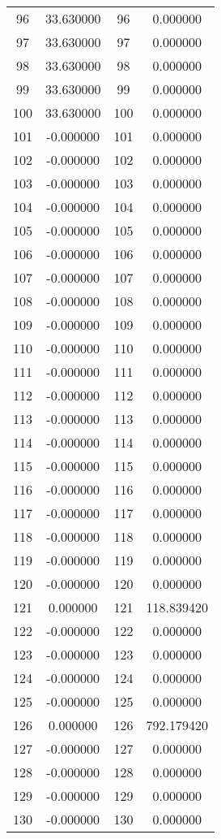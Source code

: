 \documentclass[12pt]{article}
\begin{document}
\begin{longtable}{@{}cccc@{}}
96 & 33.630000 & 96 & 0.000000 \\
97 & 33.630000 & 97 & 0.000000 \\
98 & 33.630000 & 98 & 0.000000 \\
99 & 33.630000 & 99 & 0.000000 \\
100 & 33.630000 & 100 & 0.000000 \\
101 & -0.000000 & 101 & 0.000000 \\
102 & -0.000000 & 102 & 0.000000 \\
103 & -0.000000 & 103 & 0.000000 \\
104 & -0.000000 & 104 & 0.000000 \\
105 & -0.000000 & 105 & 0.000000 \\
106 & -0.000000 & 106 & 0.000000 \\
107 & -0.000000 & 107 & 0.000000 \\
108 & -0.000000 & 108 & 0.000000 \\
109 & -0.000000 & 109 & 0.000000 \\
110 & -0.000000 & 110 & 0.000000 \\
111 & -0.000000 & 111 & 0.000000 \\
112 & -0.000000 & 112 & 0.000000 \\
113 & -0.000000 & 113 & 0.000000 \\
114 & -0.000000 & 114 & 0.000000 \\
115 & -0.000000 & 115 & 0.000000 \\
116 & -0.000000 & 116 & 0.000000 \\
117 & -0.000000 & 117 & 0.000000 \\
118 & -0.000000 & 118 & 0.000000 \\
119 & -0.000000 & 119 & 0.000000 \\
120 & -0.000000 & 120 & 0.000000 \\
121 & 0.000000 & 121 & 118.839420 \\
122 & -0.000000 & 122 & 0.000000 \\
123 & -0.000000 & 123 & 0.000000 \\
124 & -0.000000 & 124 & 0.000000 \\
125 & -0.000000 & 125 & 0.000000 \\
126 & 0.000000 & 126 & 792.179420 \\
127 & -0.000000 & 127 & 0.000000 \\
128 & -0.000000 & 128 & 0.000000 \\
129 & -0.000000 & 129 & 0.000000 \\
130 & -0.000000 & 130 & 0.000000 \\

\end{longtable}
\end{document}
